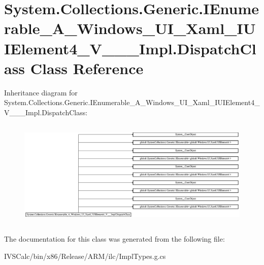 \hypertarget{class_system_1_1_collections_1_1_generic_1_1_i_enumerable___a___windows___u_i___xaml___i_u_i_ele0ea424e3536ec061253df66e409e7aed}{}\section{System.\+Collections.\+Generic.\+I\+Enumerable\+\_\+\+A\+\_\+\+Windows\+\_\+\+U\+I\+\_\+\+Xaml\+\_\+\+I\+U\+I\+Element4\+\_\+\+V\+\_\+\+\_\+\+\_\+\+Impl.\+Dispatch\+Class Class Reference}
\label{class_system_1_1_collections_1_1_generic_1_1_i_enumerable___a___windows___u_i___xaml___i_u_i_ele0ea424e3536ec061253df66e409e7aed}
Inheritance diagram for System.\+Collections.\+Generic.\+I\+Enumerable\+\_\+\+A\+\_\+\+Windows\+\_\+\+U\+I\+\_\+\+Xaml\+\_\+\+I\+U\+I\+Element4\+\_\+\+V\+\_\+\+\_\+\+\_\+\+Impl.\+Dispatch\+Class\+:\begin{figure}[H]
\begin{center}
\leavevmode
\includegraphics[height=5.220339cm]{class_system_1_1_collections_1_1_generic_1_1_i_enumerable___a___windows___u_i___xaml___i_u_i_ele0ea424e3536ec061253df66e409e7aed}
\end{center}
\end{figure}


The documentation for this class was generated from the following file\+:\begin{DoxyCompactItemize}
\item 
I\+V\+S\+Calc/bin/x86/\+Release/\+A\+R\+M/ilc/Impl\+Types.\+g.\+cs\end{DoxyCompactItemize}
